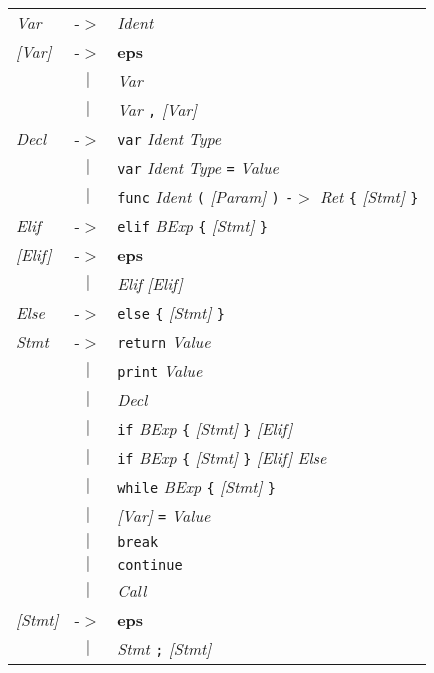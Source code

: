 \documentclass{article}
\begin{document}
\begin{tabular}{lll}
\textit{Var} & -$>$ & \textit{Ident} \\
\textit{[Var]} & -$>$ & \textbf{eps} \\
 & \multicolumn{1}{c}{\textbf{$|$}} & \textit{Var} \\
 & \multicolumn{1}{c}{\textbf{$|$}} & \textit{Var} \texttt{,} \textit{[Var]} \\
\textit{Decl} & -$>$ & \texttt{var} \textit{Ident} \textit{Type} \\
 & \multicolumn{1}{c}{\textbf{$|$}} & \texttt{var} \textit{Ident} \textit{Type} \texttt{=} \textit{Value} \\
 & \multicolumn{1}{c}{\textbf{$|$}} & \texttt{func} \textit{Ident} \texttt{(} \textit{[Param]} \texttt{)} \texttt{-$>$} \textit{Ret} \texttt{\{} \textit{[Stmt]} \texttt{\}} \\
\textit{Elif} & -$>$ & \texttt{elif} \textit{BExp} \texttt{\{} \textit{[Stmt]} \texttt{\}} \\
\textit{[Elif]} & -$>$ & \textbf{eps} \\
 & \multicolumn{1}{c}{\textbf{$|$}} & \textit{Elif} \textit{[Elif]} \\
\textit{Else} & -$>$ & \texttt{else} \texttt{\{} \textit{[Stmt]} \texttt{\}} \\
\textit{Stmt} & -$>$ & \texttt{return} \textit{Value} \\
 & \multicolumn{1}{c}{\textbf{$|$}} & \texttt{print} \textit{Value} \\
 & \multicolumn{1}{c}{\textbf{$|$}} & \textit{Decl} \\
 & \multicolumn{1}{c}{\textbf{$|$}} & \texttt{if} \textit{BExp} \texttt{\{} \textit{[Stmt]} \texttt{\}} \textit{[Elif]} \\
 & \multicolumn{1}{c}{\textbf{$|$}} & \texttt{if} \textit{BExp} \texttt{\{} \textit{[Stmt]} \texttt{\}} \textit{[Elif]} \textit{Else} \\
 & \multicolumn{1}{c}{\textbf{$|$}} & \texttt{while} \textit{BExp} \texttt{\{} \textit{[Stmt]} \texttt{\}} \\
 & \multicolumn{1}{c}{\textbf{$|$}} & \textit{[Var]} \texttt{=} \textit{Value} \\
 & \multicolumn{1}{c}{\textbf{$|$}} & \texttt{break} \\
 & \multicolumn{1}{c}{\textbf{$|$}} & \texttt{continue} \\
 & \multicolumn{1}{c}{\textbf{$|$}} & \textit{Call} \\
\textit{[Stmt]} & -$>$ & \textbf{eps} \\
 & \multicolumn{1}{c}{\textbf{$|$}} & \textit{Stmt} \texttt{;} \textit{[Stmt]} \\
\end{tabular}
\end{document}
